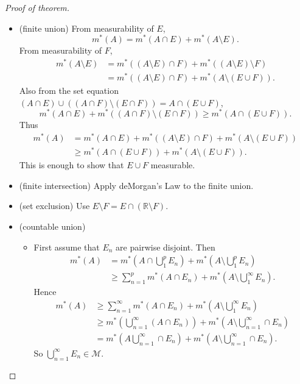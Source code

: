 \begin{proof}[Proof of theorem]
	\begin{itemize}
		\item (finite union)
			From measurability of $E$,
			\[
				m^*(A) = m^*(A \cap E) + m^*(A \setminus E)
			.\] 
			From measurability of $F$,
			\begin{align*}
				m^*(A \setminus E) &= m^*\left( (A \setminus E) \cap F \right)  + m^*\left( (A \setminus E) \setminus F \right) \\
				&=   m^*\left( (A \setminus E) \cap F \right)  + m^*\left(A \setminus( E \cup F) \right) 
			.\end{align*} 
			Also from the set equation $ (A \cap E) \cup \left( (A \cap F) \setminus (E \cap F) \right)  = A \cap (E \cup F)$,
			\[
				m^*(A \cap E) + m^*\left( (A \cap F) \setminus (E \cap F) \right) \ge m^*\left( A \cap (E \cup F) \right) 
			.\] 
			Thus
			\begin{align*}
				m^*(A) &= m^*(A \cap E) + m^*\left( (A \setminus E) \cap F \right) +m^*\left( A \setminus (E \cup F) \right)  \\
				&\ge m^*\left( A \cap (E \cup F) \right) +m^*\left( A\setminus (E \cup F) \right)  
			.\end{align*} 
			This is enough to show that $E \cup F$ measurable.

		\item (finite intersection) Apply deMorgan's Law to the finite union.
		\item (set exclusion) Use $E \setminus F = E \cap (\mathbb{R}\setminus F)$.
		\item (countable union)
			\begin{itemize}
				\item First assume that $E_n$ are pairwise disjoint. 
					Then
					\begin{align*}
						m^*(A) &= m^*\left( A \cap \bigcup_{1} ^p E_n \right) + m^*\left( A \setminus \bigcup_{1} ^p E_n \right) \\
						&\ge \sum_{n=1}^{p} m^*(A \cap E_n)+ m^*\left( A \setminus   \bigcup_{1} ^\infty  E_n \right)
					.\end{align*} 
					Hence
					\begin{align*}
						m^*(A) &\ge \sum_{n=1}^{\infty} m^*(A \cap E_n) + m^*\left( A \setminus \bigcup_{1} ^\infty  E_n \right) \\
						&\ge m^*\left( \bigcup_{n = 1} ^\infty (A \cap E_n) \right) + m^*\left( A \setminus \bigcup_{n = 1} ^\infty \cap E_n \right)\\
						&=  m^*\left(A \bigcup_{n = 1} ^\infty  \cap E_n \right) + m^*\left( A \setminus \bigcup_{n = 1} ^\infty \cap E_n \right)
					.\end{align*} 
					So $\bigcup_{n = 1} ^\infty E_n \in \mathcal{M}$.
					

\end{itemize}
\end{itemize}
\end{proof}

